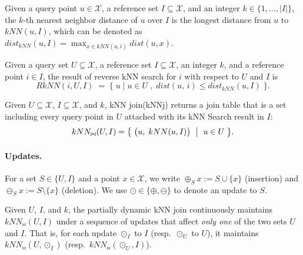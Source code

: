 \begin{definition}[k-th NN distance]\label{def:dknn}
Given a query point $u\in\mathcal{X}$, a reference set $I\subseteq\mathcal{X}$, and an integer $k\in\{1,\dots,|I|\}$,
the $k$-th nearest neighbor distance of $u$ over $I$ is the longest distance from $u$ to $kNN(u,I)$, which can be denoted as $dist_{kNN}(u,I)=\max_{x\in kNN(u,i)}dist(u,x)$.
\end{definition}




\begin{definition}\label{def:rknn}
Given a query set $U\subseteq\mathcal{X}$, a reference set $I\subseteq\mathcal{X}$, an integer $k$, and a reference point $i\in I$,
the result of reverse kNN search for $i$ with respect to $U$ and $I$ is
\[
RkNN(i,U,I) \;=\; \{\; u\;|\;u\in U \;,\; dist(u,\,i)\leq dist_{kNN}(u,I) \;\}.
\]
\end{definition}

\begin{definition}\label{def:knnj}
Given $U\subseteq\mathcal{X}$, $I\subseteq\mathcal{X}$, and $k$,
kNN join(kNNj)
returns a join table that is a set including every query point in $U$ attached with its kNN Search result in $I$:
\begin{equation}
  kNN_{\bowtie}(U,I)=
  \bigl\{\;\bigl(u,\;kNN(u,I)\bigr)\ \bigm|\ u\in U\;\bigr\}.
\end{equation}
\end{definition}

\paragraph{Updates.}{\parindent=0pt
For a set $S\in\{U,I\}$ and a point $x\in\mathcal{X}$, we write
$\oplus_{S} x := S\cup\{x\}$ (insertion) and $\ominus_{S} x := S\setminus\{x\}$ (deletion).
We use $\odot \in\{\oplus ,\ominus \}$ to denote an update to $S$.}

\begin{definition}\label{def:partial-dynamic-knnj}
Given $U$, $I$, and $k$, the partially dynamic kNN join continuously maintains $kNN_{\bowtie}(U,I)$
under a sequence of updates that affect \emph{only one} of the two sets $U$ and $I$.
That is, for each update $\odot_{I}$ to $I$ (resp.\ $\odot_{U}$ to $U$), it maintains $kNN_{\bowtie}(U,\odot_{I})$ (resp.\ $kNN_{\bowtie}(\odot_{U},I)$).
\end{definition}

